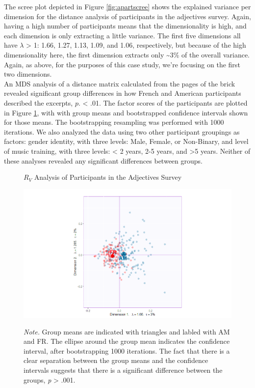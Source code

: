 \documentclass[
  english,
  man,floatsintext]{apa6}
\begin{document}
The scree plot depicted in Figure \ref{fig:apartscree} shows the explained variance per dimension for the distance analysis of participants in the adjectives survey. Again, having a high number of participants means that the dimensionality is high, and each dimension is only extracting a little variance. The first five dimensions all have \(\lambda\) \textgreater{} 1: 1.66, 1.27, 1.13, 1.09, and 1.06, respectively, but because of the high dimensionality here, the first dimension extracts only \textasciitilde3\% of the overall variance. Again, as above, for the purposes of this case study, we're focusing on the first two dimensions.\\
An MDS analysis of a distance matrix calculated from the pages of the brick revealed significant group differences in how French and American participants described the excerpts, \(\textit{p}\). \textless{} .01. The factor scores of the participants are plotted in Figure \ref{fig:map4RVA}, with with group means and bootstrapped confidence intervals shown for those means. The bootstrapping resampling was performed with 1000 iterations. We also analyzed the data using two other participant groupings as factors: gender identity, with three levels: Male, Female, or Non-Binary, and level of music training, with three levels: \textless{} 2 years, 2-5 years, and \textgreater5 years. Neither of these analyses revealed any significant differences between groups.

\begin{figure}   
  \centering  
  \caption{${R_V}$ Analysis of Participants in the Adjectives Survey}
    \includegraphics[width=0.7\columnwidth]{./Music-Descriptor-Space_files/figure-latex/apartrvmap.png}
  \label{fig:map4RVA}
  \caption*{\footnotesize \textit{Note.}  Group means are indicated with triangles and labled with AM and FR. The ellipse around the group mean indicates the confidence interval, after bootstrapping 1000 iterations. The fact that there is a clear separation between the group means and the confidence intervals suggests that there is a significant difference between the groups, \textit{p} > .001.}
\end{figure}
\end{document}
